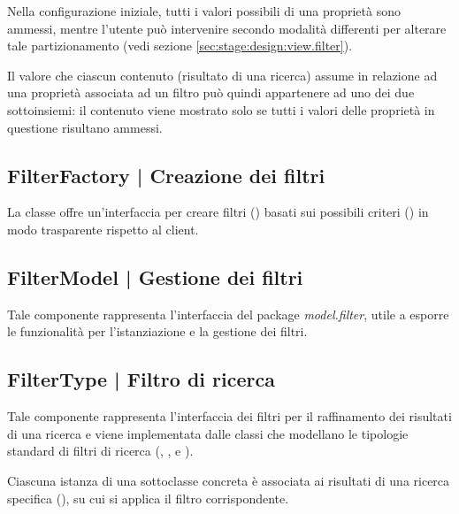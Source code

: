 \documentclass[10pt,a4paper,headinclude,footinclude,hidelinks]{scrreprt} %
\begin{document}
	Nella configurazione iniziale, tutti i valori possibili di una proprietà sono ammessi, mentre l'utente può intervenire secondo modalità differenti per alterare tale partizionamento (vedi sezione \ref{sec:stage:design:view.filter}).
	
	Il valore che ciascun contenuto (risultato di una ricerca) assume in relazione ad una proprietà associata ad un filtro può quindi appartenere ad uno dei due sottoinsiemi: il contenuto viene mostrato solo se tutti i valori delle proprietà in questione risultano ammessi.

	\subsection[FilterFactory]{FilterFactory | Creazione dei filtri}
	\label{sec:stage:design:model.filter:filter-factory}
	La classe \textit{} offre un'interfaccia per creare filtri (\textit{}) basati sui possibili criteri (\textit{}) in modo trasparente rispetto al client. 

	\subsection[FilterModel]{FilterModel | Gestione dei filtri}
	\label{sec:stage:design:model.filter:filter-manager}
	Tale componente rappresenta l'interfaccia del package \textit{model.filter}, utile a esporre le funzionalità per l'istanziazione e la gestione dei filtri.

	\subsection[FilterType]{FilterType | Filtro di ricerca}
	\label{sec:stage:design:model.filter:filter}
	Tale componente rappresenta l'interfaccia dei filtri per il raffinamento dei risultati di una ricerca e viene implementata dalle classi che modellano le tipologie standard di filtri di ricerca (\textit{}, \textit{}, \textit{} e \textit{}).
	
	Ciascuna istanza di una sottoclasse concreta è associata ai risultati di una ricerca specifica (\textit{}), su cui si applica il filtro corrispondente.
\end{document}
